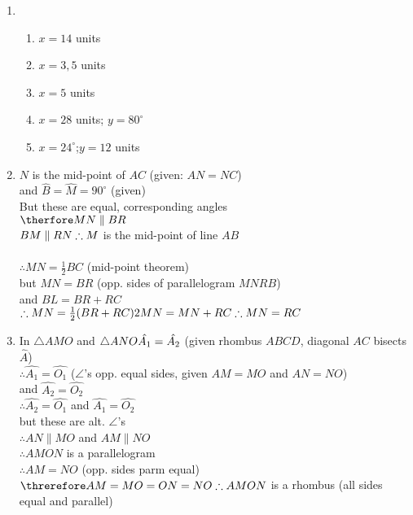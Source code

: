  \begin{solutions}{}{
\begin{enumerate}[itemsep=5pt, label=\textbf{\arabic*}. ] 


\item 
	    \begin{enumerate}[noitemsep, label=\textbf{(\alph*)} ]
		\item$x=14$ units
\item$x=3,5$ units
\item$x=5$ units
\item$x=28$ units; $y=80^{\circ}$
\item$x=24^{\circ}$;$y=12$ units
	    \end{enumerate}
\item $N$ is the mid-point of $AC$ (given: $AN=NC$)\\
and $\hat{B} = \hat{M} = 90^\circ$ (given)\\
But these are equal, corresponding angles\\
$\therfore MN \parallel BR$\\
$BM \parallel RN\\
\therefore M$ is the mid-point of line $AB$\\
\\
$\therefore MN = \frac{1}{2} BC$ (mid-point theorem)\\
but $MN=BR$ (opp. sides of parallelogram $MNRB$)\\
and $BL = BR+RC$\\
$\therefore MN = \frac{1}{2}(BR + RC)\\
2MN = MN + RC\\
\therefore MN=RC$
\item %
In $\triangle AMO$ and $\triangle ANO\\
\hat{A_1} = \hat{A_2}$ (given rhombus $ABCD$, diagonal $AC$ bisects $\hat{A}$)\\
$\therefore \hat{A_1} = \hat{O_1}$ ($\angle$'s opp. equal sides, given $AM=MO$ and $AN=NO$)\\
and $\hat{A_2} = \hat{O_2}$\\
$\therefore \hat{A_2} = \hat{O_1}$ and $\hat{A_1} = \hat{O_2}$\\
but these are alt. $\angle$'s\\
$\therefore AN \parallel MO$ and $AM \parallel NO$\\
$\therefore AMON$ is a parallelogram\\
$\therefore AM = NO$ (opp. sides parm equal)\\
$\threrefore AM=MO=ON=NO\\
\therefore AMON$ is a rhombus (all sides equal and parallel)

\end{enumerate}}
\end{solutions}


